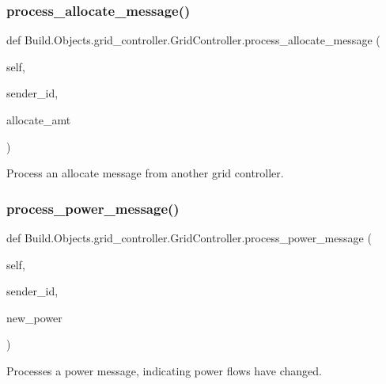 \subsubsection{\texorpdfstring{process\+\_\+allocate\+\_\+message()}{process\_allocate\_message()}}
{\footnotesize\ttfamily def Build.\+Objects.\+grid\+\_\+controller.\+Grid\+Controller.\+process\+\_\+allocate\+\_\+message (\begin{DoxyParamCaption}\item[{}]{self,  }\item[{}]{sender\+\_\+id,  }\item[{}]{allocate\+\_\+amt }\end{DoxyParamCaption})}



Process an allocate message from another grid controller. 

\mbox{\label{class_build_1_1_objects_1_1grid__controller_1_1_grid_controller_a7a07bb8716ac48899b8f0c1ee2e2f6fe}} 
\subsubsection{\texorpdfstring{process\+\_\+power\+\_\+message()}{process\_power\_message()}}
{\footnotesize\ttfamily def Build.\+Objects.\+grid\+\_\+controller.\+Grid\+Controller.\+process\+\_\+power\+\_\+message (\begin{DoxyParamCaption}\item[{}]{self,  }\item[{}]{sender\+\_\+id,  }\item[{}]{new\+\_\+power }\end{DoxyParamCaption})}



Processes a power message, indicating power flows have changed. 


